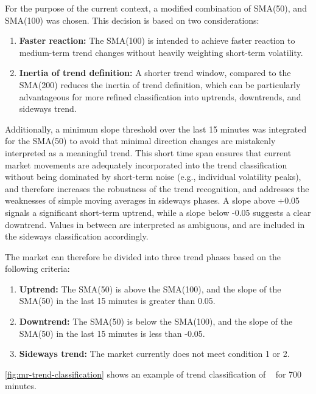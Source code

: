 For the purpose of the current context, a modified combination of SMA(50), and SMA(100) was chosen.
This decision is based on two considerations:

\begin{enumerate}
    \item \textbf{Faster reaction:} The SMA(100) is intended to achieve faster reaction to medium-term trend changes without heavily weighting short-term volatility.
    \item \textbf{Inertia of trend definition:} A shorter trend window, compared to the SMA(200) reduces the inertia of trend definition, which can be particularly advantageous for more refined classification into uptrends, downtrends, and sideways trend.
\end{enumerate}

\noindent
Additionally, a minimum slope threshold over the last 15 minutes was integrated for the SMA(50) to avoid that minimal direction changes are mistakenly interpreted as a meaningful trend.
This short time span ensures that current market movements are adequately incorporated into the trend classification without being dominated by short-term noise (e.g., individual volatility peaks), and therefore increases the robustness of the trend recognition, and addresses the weaknesses of simple moving averages in sideways phases.
A slope above +0.05 signals a significant short-term uptrend, while a slope below -0.05 suggests a clear downtrend.
Values in between are interpreted as ambiguous, and are included in the sideways classification accordingly.

The market can therefore be divided into three trend phases based on the following criteria:

\begin{enumerate}
    \item \textbf{Uptrend:} The SMA(50) is above the SMA(100), and the slope of the SMA(50) in the last 15 minutes is greater than 0.05.
    \item \textbf{Downtrend:} The SMA(50) is below the SMA(100), and the slope of the SMA(50) in the last 15 minutes is less than -0.05.
    \item \textbf{Sideways trend:} The market currently does not meet condition 1 or 2.
\end{enumerate}

\noindent
\autoref{fig:mr-trend-classification} shows an example of trend classification of \ethusdc~ for 700 minutes.

